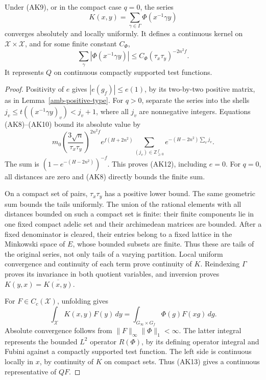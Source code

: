 \begin{theorem}\label{ak-kernel}
Under (AK9), or in the compact case \(q=0\), the series
\[
                    K(x,y)=\sum_{\gamma\in\Gamma}
                                        \Phi(x^{-1}\gamma y)
 \tag{AK11}
\]
converges absolutely and locally uniformly.
It defines a continuous kernel on
\(\mathcal X\times\mathcal X\), and for some finite
constant \(C_\Phi\),
\[
 \sum_\gamma|\Phi(x^{-1}\gamma y)|
                  \le C_\Phi(\tau_x\tau_y)^{-2n^2f}.
 \tag{AK12}
\]
It represents \(Q\) on continuous compactly supported
test functions.
\end{theorem}
\begin{proof}
Positivity of \(e\) gives \(|e(g_f)|\le e(1)\), by its
two-by-two positive matrix, as in
Lemma~\ref{amb-positive-type}.
For \(q>0\), separate the series into the shells
\(j_v\le t((x^{-1}\gamma y)_v)<j_v+1\),
where all \(j_v\) are nonnegative integers.
Equations (AK8)--(AK10) bound its absolute value by
\[
 m_0\left(\frac{3\sqrt n}{\tau_x\tau_y}\right)^{2n^2f}
 e^{f(H+2n^2)}
 \sum_{(j_v)\in\mathbb Z_{\ge0}^{\,f}}
                             e^{-(H-2n^2)\sum_vj_v}.
\]
The sum is \((1-e^{-(H-2n^2)})^{-f}\).
This proves (AK12), including \(e=0\).
For \(q=0\), all distances are zero and (AK8)
directly bounds the finite sum.

On a compact set of pairs, \(\tau_x\tau_y\) has a positive
lower bound.  The same geometric sum bounds the tails
uniformly.  The union of the rational elements with all
distances bounded on such a compact set is finite:
their finite components lie in one fixed compact adelic
set and their archimedean matrices are bounded.
After a fixed denominator is cleared, their entries
belong to a fixed lattice in the Minkowski space of \(E\),
whose bounded subsets are finite.  Thus these are tails
of the original series, not only tails of a varying
partition.  Local uniform convergence and continuity
of each term prove continuity of \(K\).
Reindexing \(\Gamma\) proves its invariance in both
quotient variables, and inversion proves
\(K(y,x)=\overline{K(x,y)}\).

For \(F\in C_c(\mathcal X)\), unfolding gives
\[
 \int_{\mathcal X}K(x,y)F(y)\,dy
       =\int_{G_\infty\times G_f}\Phi(g)F(xg)\,dg .
 \tag{AK13}
\]
Absolute convergence follows from
\(\|F\|_\infty\|\Phi\|_1<\infty\).
The latter integral represents the bounded \(L^2\)
operator \(R(\Phi)\), by its defining operator integral
and Fubini against a compactly supported test function.
The left side is continuous locally in \(x\), by
continuity of \(K\) on compact sets.  Thus (AK13)
gives a continuous representative of \(QF\).
\end{proof}

